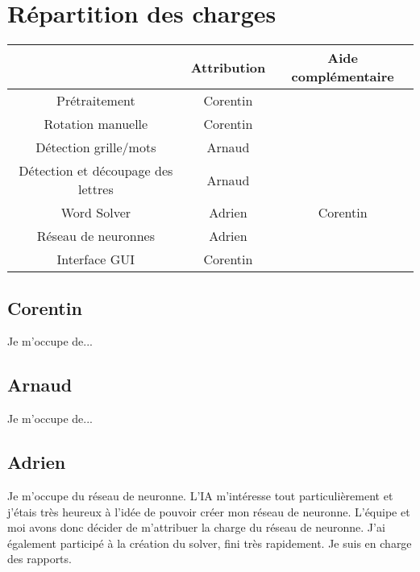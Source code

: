 \section{Répartition des charges}

\hfill

\begin{tabular}{ | c | c | c | }
\hline 
   & Attribution & Aide complémentaire\\
\hline 
   Prétraitement & Corentin &\\
\hline
   Rotation manuelle & Corentin &\\
\hline
   Détection grille/mots & Arnaud &  \\
\hline
   Détection et découpage des lettres & Arnaud & \\
\hline
   Word Solver & Adrien & Corentin \\
\hline
   Réseau de neuronnes & Adrien &  \\ 
\hline

   Interface GUI & Corentin & \\
\hline  
 \end{tabular}
\hfill \break

\subsection{Corentin}
\indent Je m'occupe de...\newline\newline
\subsection{Arnaud}
\indent Je m'occupe de...\newline\newline
\subsection{Adrien}
\indent Je m'occupe du réseau de neuronne. L'IA m'intéresse tout particulièrement et j'étais très heureux à l'idée de pouvoir créer mon réseau de neuronne. L'équipe et moi avons donc décider de m'attribuer la charge du réseau de neuronne. J'ai également participé à la création du solver, fini très rapidement. Je suis en charge des rapports. \newline\newline
